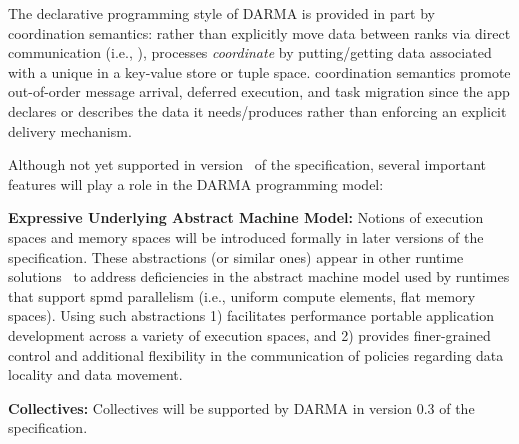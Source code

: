 The declarative programming style of DARMA is provided in part by \gls{coordination
semantics}:  rather than explicitly move data between ranks via direct communication
(i.e.,  ), processes \emph{coordinate} by putting/getting
data associated with a unique  in a
\gls{key-value store} or \gls{tuple space}.  
\Gls{coordination semantics} promote out-of-order message arrival, deferred execution, and task migration
since the app declares or describes the data it needs/produces rather than enforcing an explicit delivery mechanism.

Although not yet supported in version \specVersion\ of the specification, several
important features will play a role in the DARMA programming model:
\begin{compactdesc}
\item{\bf Expressive Underlying Abstract Machine Model:}
Notions of \glspl{execution space} and \glspl{memory space} will be introduced
formally in later
versions of the specification.  These abstractions (or similar ones) appear in other runtime
solutions~\cite{kokkos, others}  to
address deficiencies in the abstract machine model used by runtimes that
support \gls{spmd} parallelism (i.e., uniform compute elements, flat memory
    spaces).  Using such abstractions
1) facilitates performance portable application development across 
a variety of execution spaces, and 2)
  provides finer-grained control and additional flexibility in the
  communication of policies regarding data locality and data movement. 
\item{\bf Collectives:}
Collectives will be supported by DARMA in version 0.3 of the specification.
\end{compactdesc}
